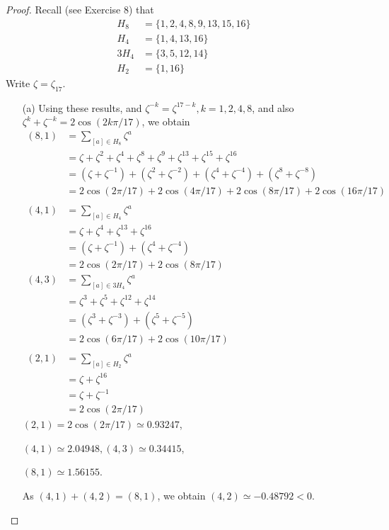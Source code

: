 \documentclass[11pt,a4paper]{article}
\begin{document}
\begin{proof}
Recall (see Exercise 8) that
\begin{align*}
H_8 &= \{1,2,4,8,9,13,15,16\}\\
H_4 &= \{1,4,13,16\}\\
3H_4 &= \{3,5,12,14\}\\
H_2 &= \{1,16\}
\end{align*}
Write $\zeta=\zeta_{17}$.

\begin{enumerate}
\item[(a)]
Using these results, and $\zeta^{-k} = \zeta^{17-k}, k=1,2,4,8$, and also $\zeta^{k} + \zeta^{-k} = 2 \cos(2k\pi/17)$, we obtain
\begin{align*}
(8,1) &= \sum_{[a]\in H_8} \zeta^a\\
&=\zeta+ \zeta^2 + \zeta^4 + \zeta^8+\zeta^9 + \zeta^{13}+ \zeta^{15}+\zeta^{16}\\
&=(\zeta+\zeta^{-1})+ (\zeta^2+\zeta^{-2})+(\zeta^4+\zeta^{-4})+ (\zeta^8+\zeta^{-8})\\
&= 2\cos(2\pi/17) + 2\cos(4\pi/17)+2\cos(8\pi/17)+2\cos(16\pi/17)\\
\\
(4,1) &= \sum_{[a]\in H_4} \zeta^a\\
&=\zeta+\zeta^4+\zeta^{13}+ \zeta^{16}\\
&= (\zeta+ \zeta^{-1}) + (\zeta^4+\zeta^{-4})\\
&= 2\cos(2\pi/17)+2\cos(8\pi/17)
\\
(4,3) &=  \sum_{[a]\in 3H_4} \zeta^a\\
&=\zeta^{3}+\zeta^5+\zeta^{12}+ \zeta^{14}\\
&= (\zeta^{3}+ \zeta^{-3}) + (\zeta^5+\zeta^{-5})\\
&= 2\cos(6\pi/17)+2\cos(10\pi/17)\\
\\
(2,1) &= \sum_{[a]\in H_2} \zeta^a\\
&=\zeta+\zeta^{16}\\
&=\zeta+ \zeta^{-1}\\
&=2\cos(2\pi/17)
\end{align*}
$(2,1) = 2\cos(2\pi/17) \simeq 0.93247$,

$(4,1) \simeq 2.04948, (4,3)\simeq 0.34415$, 

$(8,1) \simeq 1.56155$.

As $(4,1)+(4,2) = (8,1)$, we obtain $(4,2) \simeq -0.48792<0$.


\end{enumerate}
\end{proof}
\end{document}
